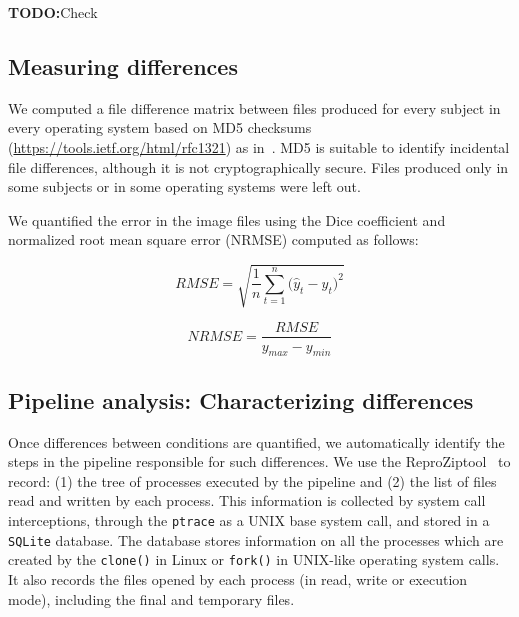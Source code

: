 \documentclass{article}
\newcommand{\todo}[1]{\color{red}\textbf{TODO:}#1\color{black}}
\newcommand{\reprozip}[0]{ReproZip}
\begin{document}
\todo{Check ~\cite{DBLP:journals/fini/DasGRSPMSRSKMKR17}}

\subsection{Measuring differences}



We computed a file difference matrix between files produced for every
subject in every operating system based on MD5 checksums~\cite{md5}
(\url{https://tools.ietf.org/html/rfc1321}) as
in~\cite{Scaria2017}. MD5 is suitable to identify incidental file
differences, although it is not cryptographically secure. Files
produced only in some subjects or in some operating systems were left out.

We quantified the error in the image files using the Dice coefficient and normalized root mean square error (NRMSE) computed as follows:
\begin{center}
\begin{equation}
RMSE = {\sqrt {\frac{1} {n}{\sum\limits_{t = 1}^n {(\hat{y}_{t} - {y}_{t} } })^{2} } }
\end{equation}
\end{center}

\begin{center}
\begin{equation}
NRMSE = {\frac{RMSE} {y_{max} - y_{min}}}
\end{equation}
\end{center}

\subsection{Pipeline analysis: Characterizing differences}

Once differences between conditions are quantified, we automatically
identify the steps in the pipeline responsible for such differences.
We use the \reprozip tool~\cite{reprozip} to record: (1) the tree of
processes executed by the pipeline and (2) the list of files read and
written by each process. This information is collected by system call
interceptions, through the \texttt{ptrace} as a UNIX base system call, and stored in a \texttt{SQLite}
database. The database stores information on all the processes which
are created by the \texttt{clone()} in Linux or \texttt{fork()} in UNIX-like
operating system calls. It also records the files opened by each process (in read, write or execution mode), including the final and
temporary files.
\end{document}
